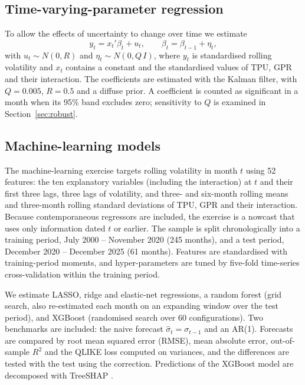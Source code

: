 \documentclass[10pt,twocolumn,a4paper]{article}
\begin{document}
\subsection{Time-varying-parameter regression}

To allow the effects of uncertainty to change over time we estimate
\begin{equation}
y_t = x_t'\beta_t + u_t,\qquad \beta_t = \beta_{t-1} + \eta_t,
\end{equation}
with $u_t\sim N(0,R)$ and $\eta_t\sim N(0,Q\,I)$, where $y_t$ is standardised rolling volatility and $x_t$ contains a constant and the standardised values of TPU, GPR and their interaction. The coefficients are estimated with the Kalman filter, with $Q=0.005$, $R=0.5$ and a diffuse prior. A coefficient is counted as significant in a month when its 95\% band excludes zero; sensitivity to $Q$ is examined in Section~\ref{sec:robust}.

\subsection{Machine-learning models}

The machine-learning exercise targets rolling volatility in month $t$ using 52 features: the ten explanatory variables (including the interaction) at $t$ and their first three lags, three lags of volatility, and three- and six-month rolling means and three-month rolling standard deviations of TPU, GPR and their interaction. Because contemporaneous regressors are included, the exercise is a nowcast that uses only information dated $t$ or earlier. The sample is split chronologically into a training period, July 2000 -- November 2020 (245 months), and a test period, December 2020 -- December 2025 (61 months). Features are standardised with training-period moments, and hyper-parameters are tuned by five-fold time-series cross-validation within the training period.

We estimate LASSO, ridge and elastic-net regressions, a random forest (grid search, also re-estimated each month on an expanding window over the test period), and XGBoost (randomised search over 60 configurations). Two benchmarks are included: the naive forecast $\hat\sigma_t=\sigma_{t-1}$ and an AR(1). Forecasts are compared by root mean squared error (RMSE), mean absolute error, out-of-sample $R^2$ and the QLIKE loss computed on variances, and the differences are tested with the \citet{diebold1995} test using the \citet{harvey1997} correction. Predictions of the XGBoost model are decomposed with TreeSHAP \citep{lundberg2017}.
\end{document}
